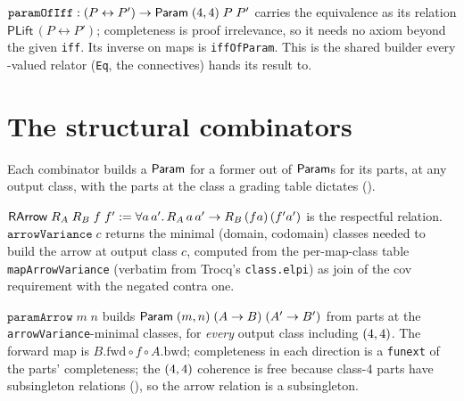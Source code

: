 \begin{definition}
  \label{def:param-of-iff}
  \leanok
  $\texttt{paramOfIff} : (P \leftrightarrow P') \to \mathsf{Param}\;(4,4)\;P\;P'$
  carries the equivalence as its relation $\mathsf{PLift}\,(P \leftrightarrow P')$;
  completeness is proof irrelevance, so it needs no axiom beyond the given
  \texttt{iff}. Its inverse on maps is \texttt{iffOfParam}. This is the shared
  builder every \PropSort-valued relator (\texttt{Eq}, the connectives) hands its
  result to.
\end{definition}

\section{The structural combinators}
\label{sec:combinators}

Each combinator builds a $\mathsf{Param}$ for a former out of $\mathsf{Param}$s for its parts,
at any output class, with the parts at the class a grading table dictates
().

\begin{definition}
  \label{def:arrow-variance}
  \leanok
  $\mathsf{RArrow}\;R_A\;R_B\;f\;f' := \forall a\,a'.\,R_A\,a\,a' \to R_B\,(f a)\,(f' a')$
  is the respectful relation. $\texttt{arrowVariance}\;c$ returns the minimal
  (domain, codomain) classes needed to build the arrow at output class $c$,
  computed from the per-map-class table \texttt{mapArrowVariance} (verbatim from
  Trocq's \texttt{class.elpi}) as $\mathrm{join}$ of the cov requirement with the
  negated contra one.
\end{definition}

\begin{theorem}
  \label{thm:param-arrow}
  \leanok
  $\texttt{paramArrow}\;m\;n$ builds $\mathsf{Param}\;(m,n)\;(A \to B)\;(A' \to B')$
  from parts at the \texttt{arrowVariance}-minimal classes, for \emph{every}
  output class including $(4,4)$. The forward map is
  $B.\mathrm{fwd} \circ f \circ A.\mathrm{bwd}$; completeness in each direction is
  a \texttt{funext} of the parts' completeness; the $(4,4)$ coherence is free
  because class-4 parts have subsingleton relations
  (), so the arrow relation is a subsingleton.
\end{theorem}

